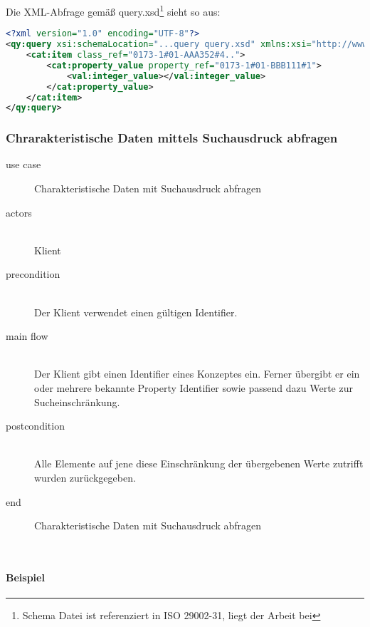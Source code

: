 Die XML-Abfrage gemäß query.xsd\footnote{Schema Datei ist referenziert in ISO 29002-31, liegt der Arbeit bei} sieht so aus:

\begin{lstlisting}[caption=Query Beispiel - Daten validieren, language=XML, label=UseCaseDatenvalidieren]
<?xml version="1.0" encoding="UTF-8"?>
<qy:query xsi:schemaLocation="...query query.xsd" xmlns:xsi="http://www.w3.org/2001/XMLSchema-instance" xmlns:cat="...catalogue" xmlns:val="...value" xmlns:qy="...query" xmlns:bas="...basic">
	<cat:item class_ref="0173-1#01-AAA352#4..">
		<cat:property_value property_ref="0173-1#01-BBB111#1">
			<val:integer_value></val:integer_value>
		</cat:property_value>
	</cat:item>
</qy:query>
\end{lstlisting}

\subsubsection{Chrarakteristische Daten mittels Suchausdruck abfragen }

{\small

\begin{description}
     \item[use case] Charakteristische Daten mit Suchausdruck abfragen
     \item[  actors]~\\
     Klient
     \item[  precondition]~\\
     Der Klient verwendet einen gültigen Identifier.
     \item[  main flow]~\\
     Der Klient gibt einen Identifier eines Konzeptes ein. Ferner übergibt er ein oder mehrere bekannte Property Identifier sowie passend dazu Werte zur Sucheinschränkung. 
     \item[  postcondition]~\\
     Alle Elemente auf jene diese Einschränkung der übergebenen Werte zutrifft wurden zurückgegeben. 
     \item[end] Charakteristische Daten mit Suchausdruck abfragen
\end{description}

~\\

} %

\paragraph{Beispiel}

